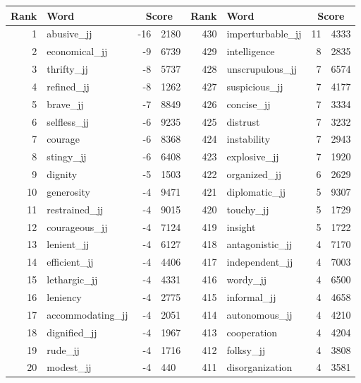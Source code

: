 \begin{table}[tbp]
    \begin{tabular}{| rlr@{.}l | rlr@{.}l |}
    \hline
    \textbf{Rank} & \textbf{Word} & \multicolumn{2}{c|}{\textbf{Score}} & \textbf{Rank} & \textbf{Word} & \multicolumn{2}{c|}{\textbf{Score}} \\
    \hline
    1 & abusive\_jj & -16 & 2180    &    430 & imperturbable\_jj & 11 & 4333 \\
    2 & economical\_jj & -9 & 6739    &    429 & intelligence & 8 & 2835 \\
    3 & thrifty\_jj & -8 & 5737    &    428 & unscrupulous\_jj & 7 & 6574 \\
    4 & refined\_jj & -8 & 1262    &    427 & suspicious\_jj & 7 & 4177 \\
    5 & brave\_jj & -7 & 8849    &    426 & concise\_jj & 7 & 3334 \\
    6 & selfless\_jj & -6 & 9235    &    425 & distrust & 7 & 3232 \\
    7 & courage & -6 & 8368    &    424 & instability & 7 & 2943 \\
    8 & stingy\_jj & -6 & 6408    &    423 & explosive\_jj & 7 & 1920 \\
    9 & dignity & -5 & 1503    &    422 & organized\_jj & 6 & 2629 \\
    10 & generosity & -4 & 9471    &    421 & diplomatic\_jj & 5 & 9307 \\
    11 & restrained\_jj & -4 & 9015    &    420 & touchy\_jj & 5 & 1729 \\
    12 & courageous\_jj & -4 & 7124    &    419 & insight & 5 & 1722 \\
    13 & lenient\_jj & -4 & 6127    &    418 & antagonistic\_jj & 4 & 7170 \\
    14 & efficient\_jj & -4 & 4406    &    417 & independent\_jj & 4 & 7003 \\
    15 & lethargic\_jj & -4 & 4331    &    416 & wordy\_jj & 4 & 6500 \\
    16 & leniency & -4 & 2775    &    415 & informal\_jj & 4 & 4658 \\
    17 & accommodating\_jj & -4 & 2051    &    414 & autonomous\_jj & 4 & 4210 \\
    18 & dignified\_jj & -4 & 1967    &    413 & cooperation & 4 & 4204 \\
    19 & rude\_jj & -4 & 1716    &    412 & folksy\_jj & 4 & 3808 \\
    20 & modest\_jj & -4 & 440    &    411 & disorganization & 4 & 3581 \\

\end{tabular}
\end{table}
